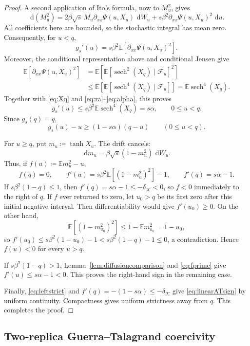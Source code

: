 \documentclass[11pt]{article}
\numberwithin{equation}{section}
\newcommand{\E}{\mathbb{E}}
\newcommand{\1}{\mathbf 1}
\newcommand{\sech}{\operatorname{sech}}
\newcommand{\cK}{\mathcal K}
\newcommand{\dd}{\,\mathrm d}
\begin{document}
\begin{proof}
A second application of Ito's formula, now to $M_u^2$, gives
\[
 \dd(M_u^2)
 =2\beta\sqrt{s}\,M_u\partial_{xx}\Psi(u,X_u)\,\dd W_u
  +s\beta^2\partial_{xx}\Psi(u,X_u)^2\,\dd u.
\]
All coefficients here are bounded, so the stochastic integral has mean
zero.  Consequently, for $u<q$,
\[
 g_s'(u)
 =s\beta^2\E[\partial_{xx}\Psi(u,X_u)^2].
\]
Moreover, the conditional representation above and conditional Jensen
give
\begin{align*}
 \E[\partial_{xx}\Psi(u,X_u)^2]
 &=\E\left[\E[\sech^2(X_q)\mid\mathcal F_u]^2\right]\\
 &\le \E\left[\E[\sech^4(X_q)\mid\mathcal F_u]\right]
 =\E\sech^4(X_q).
\end{align*}
Together with \eqref{eq:Xq} and \eqref{eq:ra}--\eqref{eq:alpha}, this
proves
\[
 g_s'(u)\le s\beta^2\E\sech^4(X_q)=s\alpha,
 \qquad 0\le u<q.
\]
Since $g_s(q)=q$,
\begin{equation}
 g_s(u)-u\ge(1-s\alpha)(q-u)
 \qquad(0\le u<q).
 \label{eq:leftstrict}
\end{equation}

For $u\ge q$, put $m_u\coloneqq\tanh X_u$.  The drift cancels:
\begin{equation}
 \dd m_u=\beta\sqrt{s}(1-m_u^2)\,\dd W_u.
 \label{eq:mdiffusion}
\end{equation}
Thus, if $f(u)\coloneqq\E m_u^2-u$,
\begin{equation}
 f(q)=0,\qquad f'(u)=s\beta^2\E[(1-m_u^2)^2]-1,
 \qquad f'(q)=s\alpha-1.
 \label{eq:fprime}
\end{equation}
If $s\beta^2(1-q)\le1$, then
$f'(q)=s\alpha-1\le-\delta_{\cK}<0$, so $f<0$ immediately to the
right of $q$.  If $f$ ever returned to zero, let $u_0>q$ be its first
zero after this initial negative interval.  Then differentiability
would give $f'(u_0)\ge0$.  On the other hand,
\[
 \E[(1-m_{u_0}^2)^2]\le1-\E m_{u_0}^2=1-u_0,
\]
so $f'(u_0)\le s\beta^2(1-u_0)-1
<s\beta^2(1-q)-1\le0$, a contradiction.  Hence $f(u)<0$ for every
$u>q$.

If $s\beta^2(1-q)>1$, Lemma~\ref{lem:diffusioncomparison} and
\eqref{eq:fprime} give $f'(u)\le s\alpha-1<0$.  This proves the
right-hand sign in the remaining case.

Finally, \eqref{eq:leftstrict} and
$f'(q)=-(1-s\alpha)\le-\delta_{\cK}$ give
\eqref{eq:linearATsign} by uniform continuity.  Compactness gives
uniform strictness away from $q$.  This completes the proof.
\end{proof}

\subsection{Two-replica Guerra--Talagrand coercivity}\label{subsec:GT}
\end{document}
